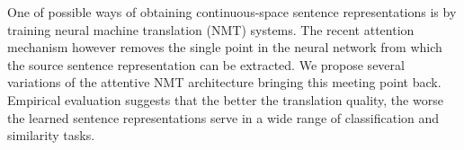 One of possible ways of obtaining continuous-space sentence representations is by training neural machine translation (NMT) systems. The recent attention mechanism however removes the single point in the neural network from which the source sentence representation can be extracted. We propose several variations of the attentive NMT architecture bringing this meeting point back. Empirical evaluation suggests that the better the translation quality, the worse the learned sentence representations serve in a wide range of classification and similarity tasks.
